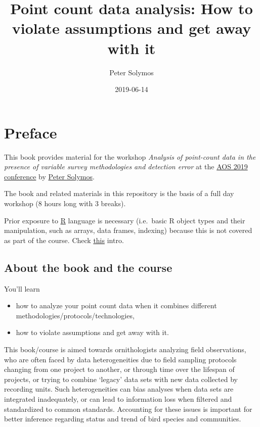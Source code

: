 \documentclass[12pt,]{book}
\title{Point count data analysis: How to violate assumptions and get away with it}
\author{Peter Solymos}
\date{2019-06-14}
\providecommand{\tightlist}{%
  \setlength{\itemsep}{0pt}\setlength{\parskip}{0pt}}
\begin{document}
\maketitle

{
\hypersetup{linkcolor=black}
\setcounter{tocdepth}{2}
\tableofcontents
}
\listoftables
\listoffigures
\hypertarget{foreword}{%
\chapter*{Preface}\label{foreword}}

This book provides material for the workshop
\emph{Analysis of point-count data in the presence of variable survey methodologies and detection error}
at the \href{https://amornithmeeting.org/}{AOS 2019 conference}
by \href{http://peter.solymos.org}{Peter Solymos}.

The book and related materials in this repository is the basis of a
full day workshop (8 hours long with 3 breaks).

Prior exposure to \href{https://www.r-project.org/}{R} language is necessary
(i.e.~basic R object types and their manipulation, such as arrays, data frames, indexing)
because this is not covered as part of the course.
Check \href{_etc/R-basics.pdf}{this} intro.

\hypertarget{about-the-book-and-the-course}{%
\section*{About the book and the course}\label{about-the-book-and-the-course}}

You'll learn

\begin{itemize}
\tightlist
\item
  how to analyze your point count data when it combines different methodologies/protocols/technologies,
\item
  how to violate assumptions and get away with it.
\end{itemize}

This book/course is aimed towards ornithologists analyzing field observations,
who are often faced by data heterogeneities due to
field sampling protocols changing from one project to another,
or through time over the lifespan of projects, or trying to combine
`legacy' data sets with new data collected by recording units.
Such heterogeneities can bias analyses when data sets are integrated
inadequately, or can lead to information loss when filtered and standardized to
common standards. Accounting for these issues is important for better
inference regarding status and trend of bird species and communities.
\end{document}
